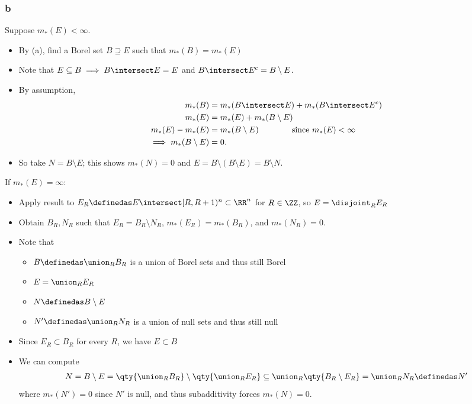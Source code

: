 \begin{solution}
\hypertarget{b-4}{%
\subsubsection{b}\label{b-4}}

Suppose \(m_*(E) < \infty\).

\begin{itemize}
\tightlist
\item
  By (a), find a Borel set \(B\supseteq E\) such that
  \(m_*(B) = m_*(E)\)
\item
  Note that \(E\subseteq B \implies B\intersect E = E\) and
  \(B\intersect E^c = B\setminus E\).
\item
  By assumption,
  \begin{align*}
  m_*(B) &= m_*(B\intersect E) + m_*(B\intersect E^c) \\
  m_*(E) &= m_*(E) + m_*(B\setminus E) \\ 
  m_*(E) - m_*(E) &= m_*(B\setminus E) \qquad\qquad\text{since } m_*(E) < \infty \\ 
  \implies m_*(B\setminus E) &= 0
  .\end{align*}
\item
  So take \(N = B\setminus E\); this shows \(m_*(N) = 0\) and
  \(E = B\setminus (B\setminus E) = B\setminus N\).
\end{itemize}

If \(m_*(E) = \infty\):

\begin{itemize}
\tightlist
\item
  Apply result to
  \(E_R\definedas E \intersect [R, R+1)^n \subset \RR^n\) for
  \(R\in \ZZ\), so \(E = \disjoint_R E_R\)
\item
  Obtain \(B_R, N_R\) such that \(E_R = B_R \setminus N_R\),
  \(m_*(E_R) = m_*(B_R)\), and \(m_*(N_R) = 0\).
\item
  Note that

  \begin{itemize}
  \tightlist
  \item
    \(B\definedas \union_R B_R\) is a union of Borel sets and thus still
    Borel
  \item
    \(E = \union_R E_R\)
  \item
    \(N\definedas B\setminus E\)
  \item
    \(N' \definedas \union_R N_R\) is a union of null sets and thus
    still null
  \end{itemize}
\item
  Since \(E_R \subset B_R\) for every \(R\), we have \(E\subset B\)
\item
  We can compute
  \begin{align*}
  N = B\setminus E = \qty{ \union_R B_R } \setminus \qty{\union_R E_R } \subseteq \union_R \qty{B_R\setminus E_R} = \union_R N_R \definedas N'
  \end{align*} where \(m_*(N') = 0\) since \(N'\) is null, and thus
  subadditivity forces \(m_*(N) = 0\).
\end{itemize}

\end{solution}

